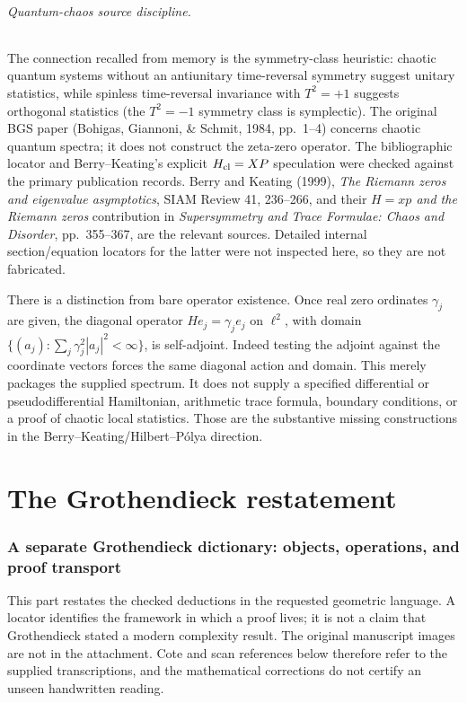 \documentclass[11pt,a4paper]{article}
\theoremstyle{definition}\newtheorem{definition}{Definition}
\begin{document}
\paragraph{Quantum-chaos source discipline.}
The connection recalled from memory is the symmetry-class heuristic: chaotic quantum systems without an antiunitary time-reversal symmetry suggest unitary statistics, while spinless time-reversal invariance with $T^2=+1$ suggests orthogonal statistics (the $T^2=-1$ symmetry class is symplectic). The original BGS paper (Bohigas, Giannoni, \& Schmit, 1984, pp.~1--4) concerns chaotic quantum spectra; it does not construct the zeta-zero operator. The bibliographic locator and Berry--Keating's explicit $H_{\rm cl}=XP$ speculation were checked against the primary publication records. Berry and Keating (1999), \emph{The Riemann zeros and eigenvalue asymptotics}, SIAM Review 41, 236--266, and their \emph{$H=xp$ and the Riemann zeros} contribution in \emph{Supersymmetry and Trace Formulae: Chaos and Disorder}, pp.~355--367, are the relevant sources. Detailed internal section/equation locators for the latter were not inspected here, so they are not fabricated.

There is a distinction from bare operator existence. Once real zero ordinates $\gamma_j$ are given, the diagonal operator $He_j=\gamma_je_j$ on $\ell^2$, with domain $\{(a_j):\sum_j\gamma_j^2|a_j|^2<\infty\}$, is self-adjoint. Indeed testing the adjoint against the coordinate vectors forces the same diagonal action and domain. This merely packages the supplied spectrum. It does not supply a specified differential or pseudodifferential Hamiltonian, arithmetic trace formula, boundary conditions, or a proof of chaotic local statistics. Those are the substantive missing constructions in the Berry--Keating/Hilbert--P\'olya direction.


\part{The Grothendieck restatement}
\section{A separate Grothendieck dictionary: objects, operations, and proof transport}
\label{sec:grothendieck-dictionary}

This part restates the checked deductions in the requested geometric language. A locator identifies the framework in which a proof lives; it is not a claim that Grothendieck stated a modern complexity result. The original manuscript images are not in the attachment. Cote and scan references below therefore refer to the supplied transcriptions, and the mathematical corrections do not certify an unseen handwritten reading.
\end{document}
